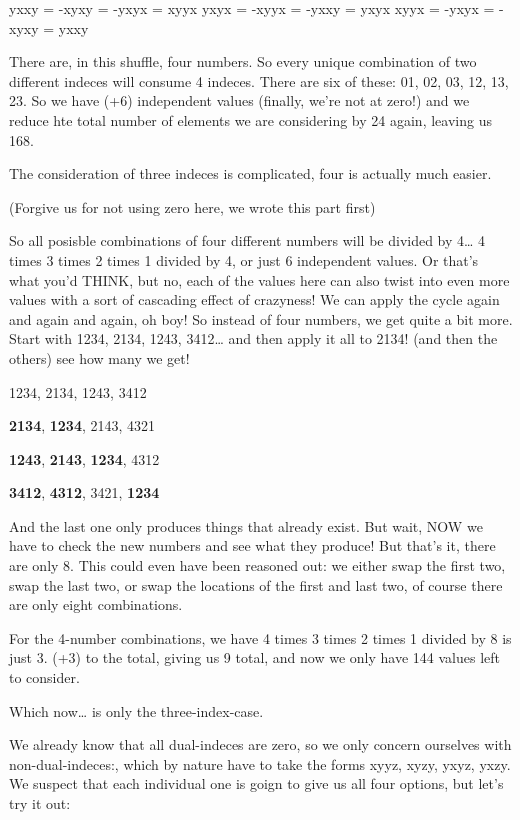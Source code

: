 \documentclass[landscape,letterpaper,10pt,english]{article}
\begin{document}
yxxy = -xyxy = -yxyx = xyyx yxyx = -xyyx = -yxxy = yxyx xyyx = -yxyx =
-xyxy = yxxy

There are, in this shuffle, four numbers. So every unique combination of
two different indeces will consume 4 indeces. There are six of these:
01, 02, 03, 12, 13, 23. So we have (+6) independent values (finally,
we're not at zero!) and we reduce hte total number of elements we are
considering by 24 again, leaving us 168.

The consideration of three indeces is complicated, four is actually much
easier.

(Forgive us for not using zero here, we wrote this part first)

So all posisble combinations of four different numbers will be divided
by 4\ldots{} 4 times 3 times 2 times 1 divided by 4, or just 6
independent values. Or that's what you'd THINK, but no, each of the
values here can also twist into even more values with a sort of
cascading effect of crazyness! We can apply the cycle again and again
and again, oh boy! So instead of four numbers, we get quite a bit more.
Start with 1234, 2134, 1243, 3412\ldots{} and then apply it all to 2134!
(and then the others) see how many we get!

1234, 2134, 1243, 3412

\textbf{2134}, \textbf{1234}, 2143, 4321

\textbf{1243}, \textbf{2143}, \textbf{1234}, 4312

\textbf{3412}, \textbf{4312}, 3421, \textbf{1234}

And the last one only produces things that already exist. But wait, NOW
we have to check the new numbers and see what they produce! But that's
it, there are only 8. This could even have been reasoned out: we either
swap the first two, swap the last two, or swap the locations of the
first and last two, of course there are only eight combinations.

For the 4-number combinations, we have 4 times 3 times 2 times 1 divided
by 8 is just 3. (+3) to the total, giving us 9 total, and now we only
have 144 values left to consider.

Which now\ldots{} is only the three-index-case.

    We already know that all dual-indeces are zero, so we only concern
ourselves with non-dual-indeces:, which by nature have to take the forms
xyyz, xyzy, yxyz, yxzy. We suspect that each individual one is goign to
give us all four options, but let's try it out:
\end{document}

